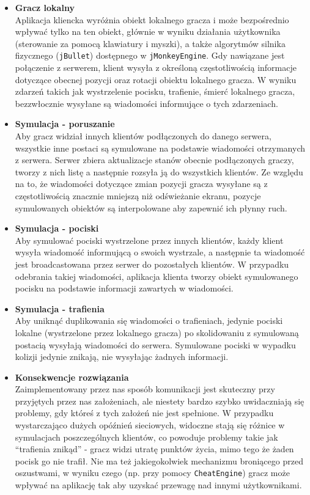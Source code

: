 \documentclass[]{report}
\newcommand{\code}[1]{\colorbox{codegray}{\texttt{#1}}}
\begin{document}
\begin{itemize}
	\item \textbf{Gracz lokalny} \\
	Aplikacja kliencka wyróżnia obiekt lokalnego gracza i może bezpośrednio wpływać tylko na ten obiekt, głównie w wyniku działania użytkownika (sterowanie za pomocą klawiatury i myszki), a także algorytmów silnika fizycznego (\code{jBullet}) dostępnego w \code{jMonkeyEngine}. Gdy nawiązane jest połączenie z serwerem, klient wysyła z określoną częstotliwością informacje dotyczące obecnej pozycji oraz rotacji obiektu lokalnego gracza. W wyniku zdarzeń takich jak wystrzelenie pocisku, trafienie, śmierć lokalnego gracza, bezzwłocznie wysyłane są wiadomości informujące o tych zdarzeniach.
	\item \textbf{Symulacja - poruszanie} \\
	Aby gracz widział innych klientów podłączonych do danego serwera, wszystkie inne postaci są symulowane na podstawie wiadomości otrzymanych z serwera. Serwer zbiera aktualizacje stanów obecnie podłączonych graczy, tworzy z nich listę a następnie rozsyła ją do wszystkich klientów. Ze względu na to, że wiadomości dotyczące zmian pozycji gracza wysyłane są z częstotliwością znacznie mniejszą niż odświeżanie ekranu, pozycje symulowanych obiektów są interpolowane aby zapewnić ich płynny ruch.
	\item \textbf{Symulacja - pociski} \\
	Aby symulować pociski wystrzelone przez innych klientów, każdy klient wysyła wiadomość informującą o swoich wystrzale, a następnie ta wiadomość jest broadcastowana przez serwer do pozostałych klientów. W przypadku odebrania takiej wiadomości, aplikacja klienta tworzy obiekt symulowanego pocisku na podstawie informacji zawartych w wiadomości.
	\item \textbf{Symulacja - trafienia} \\
	Aby uniknąć duplikowania się wiadomości o trafieniach, jedynie pociski lokalne (wystrzelone przez lokalnego gracza) po skolidowaniu z symulowaną postacią wysyłają wiadomości do serwera. Symulowane pociski w wypadku kolizji jedynie znikają, nie wysyłając żadnych informacji.
	\item \textbf{Konsekwencje rozwiązania} \\
	Zaimplementowany przez nas sposób komunikacji jest skuteczny przy przyjętych przez nas założeniach, ale niestety bardzo szybko uwidaczniają się problemy, gdy któreś z tych założeń nie jest spełnione. W przypadku wystarczająco dużych opóźnień sieciowych, widoczne stają się różnice w symulacjach poszczególnych klientów, co powoduje problemy takie jak “trafienia znikąd” - gracz widzi utratę punktów życia, mimo tego że żaden pocisk go nie trafił. Nie ma też jakiegokolwiek mechanizmu broniącego przed oszustwami, w wyniku czego (np. przy pomocy \code{CheatEngine}) gracz może wpływać na aplikację tak aby uzyskać przewagę nad innymi użytkownikami.
\end{itemize}
\end{document}
